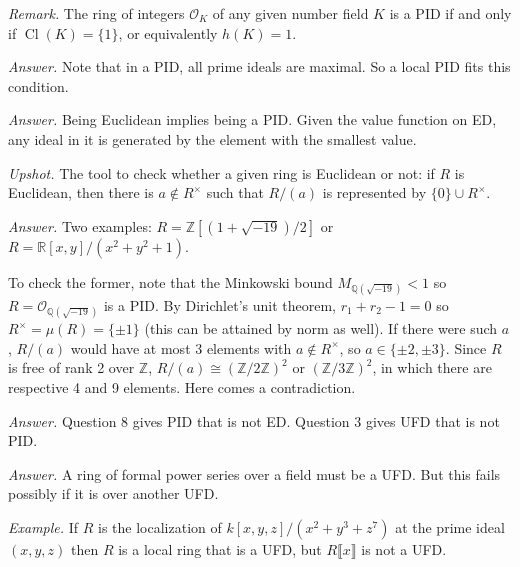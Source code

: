 \documentclass{mathproblems}
\newcommand\Q{\mathbb{Q}}
\newcommand\R{\mathbb{R}}
\newcommand\Z{\mathbb{Z}}
\newcommand\OO{\mathcal{O}}
\begin{document}
\begin{questions}
\textit{Remark.} The ring of integers $\OO_K$ of any given number field $K$ is a PID if and only if $\operatorname{Cl}(K)=\{1\}$, or equivalently $h(K)=1$.


\textit{Answer.} Note that in a PID, all prime ideals are maximal. So a local PID fits this condition.


\textit{Answer.} Being Euclidean implies being a PID. Given the value function on ED, any ideal in it is generated by the element with the smallest value.


{\color{violet}
\textit{Upshot.} The tool to check whether a given ring is Euclidean or not: if $R$ is Euclidean, then there is $a\notin R^\times$ such that $R/(a)$ is represented by $\{0\}\cup R^\times$.
}

\textit{Answer.} Two examples: $R=\Z[(1+\sqrt{-19})/2]$ or $R=\R[x,y]/(x^2+y^2+1)$. 

To check the former, note that the Minkowski bound $M_{\Q(\sqrt{-19})}<1$ so $R=\OO_{\Q(\sqrt{-19})}$ is a PID. By Dirichlet's unit theorem, $r_1+r_2-1=0$ so $R^\times=\mu(R)=\{\pm 1\}$ (this can be attained by norm as well). If there were such $a$, $R/(a)$ would have at most 3 elements with $a\notin R^\times$, so $a\in \{\pm 2,\pm 3\}$. Since $R$ is free of rank 2 over $\Z$, $R/(a)\cong (\Z/2\Z)^2$ or $(\Z/3\Z)^2$, in which there are respective 4 and 9 elements. Here comes a contradiction.


\textit{Answer.} Question 8 gives PID that is not ED. Question 3 gives UFD that is not PID.


\textit{Answer.} A ring of formal power series over a field must be a UFD. But this fails possibly if it is over another UFD. 

\textit{Example.} If $R$ is the localization of $k[x,y,z]/(x^2 + y^3 + z^7)$ at the prime ideal $(x,y,z)$ then $R$ is a local ring that is a UFD, but $R \llbracket x \rrbracket$ is not a UFD.



\end{questions}
\end{document}

